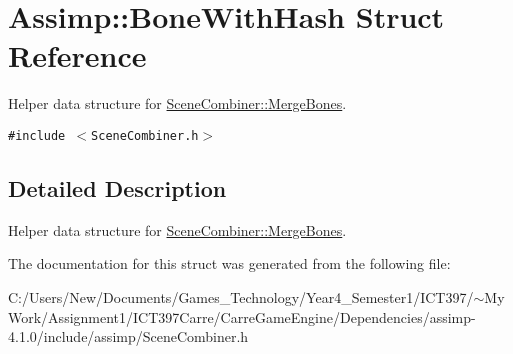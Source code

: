 \hypertarget{struct_assimp_1_1_bone_with_hash}{
\section{Assimp::BoneWithHash Struct Reference}
\label{struct_assimp_1_1_bone_with_hash}
}
Helper data structure for \hyperlink{class_assimp_1_1_scene_combiner_a42d5370510db89cbdd739617a617d4e}{SceneCombiner::MergeBones}.  


{\tt \#include $<$SceneCombiner.h$>$}



\subsection{Detailed Description}
Helper data structure for \hyperlink{class_assimp_1_1_scene_combiner_a42d5370510db89cbdd739617a617d4e}{SceneCombiner::MergeBones}. 

The documentation for this struct was generated from the following file:\begin{CompactItemize}
\item 
C:/Users/New/Documents/Games\_\-Technology/Year4\_\-Semester1/ICT397/$\sim$My Work/Assignment1/ICT397Carre/CarreGameEngine/Dependencies/assimp-4.1.0/include/assimp/SceneCombiner.h\end{CompactItemize}
